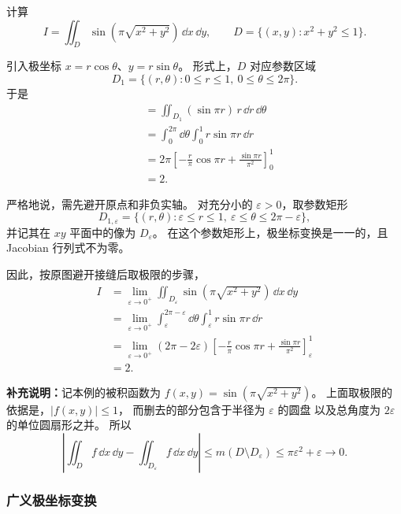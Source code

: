 \begin{example}[圆域上的极坐标积分]
计算
\[
I=\iint_D\sin\!\left(\pi\sqrt{x^2+y^2}\right)\,\dd x\,\dd y,
\qquad
D=\{(x,y):x^2+y^2\le1\}.
\]
\end{example}
\begin{solution}
引入极坐标 $x=r\cos\theta$、$y=r\sin\theta$。
形式上，$D$ 对应参数区域
\[
D_1=\{(r,\theta):0\le r\le1,\ 0\le\theta\le2\pi\}.
\]
于是
\[
\begin{aligned}
&=\iint_{D_1}(\sin\pi r)\,r\,\dd r\,\dd\theta\\
&=\int_0^{2\pi}\dd\theta\int_0^1r\sin\pi r\,\dd r\\
&=2\pi\left[-\frac r\pi\cos\pi r
+\frac{\sin\pi r}{\pi^2}\right]_0^1\\
&=2.
\end{aligned}
\]

严格地说，需先避开原点和非负实轴。
对充分小的 $\varepsilon>0$，取参数矩形
\[
D_{1,\varepsilon}
=\{(r,\theta):\varepsilon\le r\le1,\
\varepsilon\le\theta\le2\pi-\varepsilon\},
\]
并记其在 $xy$ 平面中的像为 $D_\varepsilon$。
在这个参数矩形上，极坐标变换是一一的，且 Jacobian 行列式不为零。

\begin{center}

\end{center}

因此，按原图避开接缝后取极限的步骤，
\[
\begin{aligned}
I
&=\lim_{\varepsilon\to0^+}
\iint_{D_\varepsilon}
\sin\!\left(\pi\sqrt{x^2+y^2}\right)\,\dd x\,\dd y\\
&=\lim_{\varepsilon\to0^+}
\int_\varepsilon^{2\pi-\varepsilon}\dd\theta
\int_\varepsilon^1r\sin\pi r\,\dd r\\
&=\lim_{\varepsilon\to0^+}
(2\pi-2\varepsilon)
\left[-\frac r\pi\cos\pi r
+\frac{\sin\pi r}{\pi^2}\right]_\varepsilon^1\\
&=2.
\end{aligned}
\]

\textbf{补充说明：}记本例的被积函数为
$f(x,y)=\sin(\pi\sqrt{x^2+y^2})$。
上面取极限的依据是，$|f(x,y)|\le1$，
而删去的部分包含于半径为 $\varepsilon$ 的圆盘
以及总角度为 $2\varepsilon$ 的单位圆扇形之并。
所以
\[
\left|\iint_D f\,\dd x\,\dd y
-\iint_{D_\varepsilon}f\,\dd x\,\dd y\right|
\le m(D\setminus D_\varepsilon)
\le\pi\varepsilon^2+\varepsilon\longrightarrow0.
\]
\end{solution}

\subsubsection*{广义极坐标变换}

